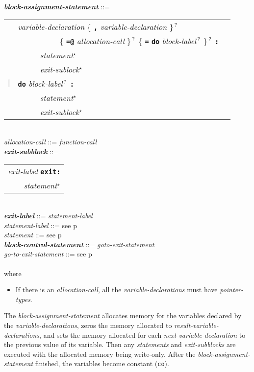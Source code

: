 \documentclass[12pt]{article}
\newcommand{\TT}[1]{{\tt \bfseries #1}}
\newcommand{\STAR}{{\Large $^\star$}}
\newcommand{\QMARK}{{$^{\,\mbox{\footnotesize ?}}$}}
\newcommand{\ttkey}[1]{{\tt \bfseries #1}}
\newcommand{\emkey}[1]{{\em \bfseries #1}}
\newcommand{\pagref}[1]{p\pageref{#1}}
\newenvironment{indpar}[1][0.3in]%
	{\begin{list}{}%
		     {\setlength{\itemsep}{0in}%
		      \setlength{\topsep}{0in}%
		      \setlength{\parsep}{1ex}%
		      \setlength{\labelwidth}{#1}%
		      \setlength{\leftmargin}{#1}%
		      \addtolength{\leftmargin}{\labelsep}}%
	 \item}%
	{\end{list}}
\begin{document}
\begin{indpar}
\emkey{block-assignment-statement} ::= \\
\hspace*{0.5in}
    \begin{tabular}[t]{@{}rll}
        & {\em variable-declaration}
                \{ \TT{,} {\em variable-declaration} \}\QMARK{} \\
	& ~~~~~~~~~~ \{ \TT{=@} {\em allocation-call} \}\QMARK{}
		\{ \TT{=}
		   \ttkey{do} {\em block-label}\QMARK{} \}\QMARK{} \TT{:} \\
        & ~~~~~ {\em statement}\STAR{} \\
        & ~~~~~ {\em exit-sublock}\STAR{} \\
    $|$ & \ttkey{do} {\em block-label}\QMARK{} \TT{:} \\
        & ~~~~~ {\em statement}\STAR{} \\
        & ~~~~~ {\em exit-sublock}\STAR{} \\
    \end{tabular}
\\[0.5ex]
{\em allocation-call} ::= {\em function-call}
\\[0.5ex]
\emkey{exit-subblock}\label{EXIT-SUBBLOCK} ::=
    \begin{tabular}[t]{l}
    {\em exit-label} \ttkey{exit}\TT{:} \\
    \TT{~~~~}{\em statement}\STAR{} \\
    \end{tabular} \\
\emkey{exit-label} ::= {\em statement-label}
\\[0.5ex]
{\em statement-label} ::= see \pagref{STATEMENT-LABEL} \\
{\em statement} ::= see \pagref{STATEMENT} \\
\emkey{block-control-statement}\label{BLOCK-CONTROL-STATEMENT}
	::= {\em goto-exit-statement} \\
{\em go-to-exit-statement} ::= see \pagref{GO-TO-STATEMENT} \\
\\[1ex]
where
\begin{itemize}
\item If there is an {\em allocation-call}, all the
{\em variable-declarations} must have {\em pointer-types}.
\end{itemize}
\end{indpar}

The {\em block-assignment-statement}
allocates memory for the variables declared by the {\em variable-declarations},
zeros the memory allocated to {\em result-variable-declarations},
and sets the memory allocated for each {\em next-variable-declaration}
to the previous value of its variable.
Then any {\em statements} and
{\em exit-subblocks} are executed with
the allocated memory being write-only.
After the {\em block-assignment-statement} finished, the variables
become constant ({\tt co}).
\end{document}
